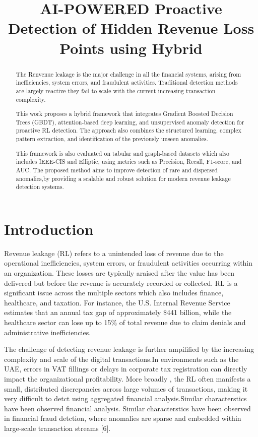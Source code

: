 \documentclass[conference]{IEEEtran}
\title{AI-POWERED Proactive Detection of Hidden Revenue Loss Points using Hybrid}
\author{
\IEEEauthorblockN{Shambhavi Jha, Venkata Shreya Vella}
\IEEEauthorblockA{Department of Computer Science \\
BITS Pilani, Dubai Campus \\
Email: f20230009@dubai.bits-pilani.ac.in, f20230096@dubai.bits-pilani.ac.in}
}
\begin{document}
\maketitle

\begin{abstract}

The Renvenue leakage is the major challenge in  all the financial systems, arising from inefficiencies, system errors, and fraudulent activities. Traditional detection methods are largely reactive they fail to scale with the current increasing transaction complexity.

This work proposes a hybrid framework that integrates Gradient Boosted Decision Trees (GBDT), attention-based deep learning, and unsupervised anomaly detection for proactive RL detection. The approach also combines the structured learning, complex pattern extraction, and identification of the previously unseen anomalies. 

This framework is also evaluated on tabular and graph-based datasets which also includes IEEE-CIS and Elliptic, using metrics such as Precision, Recall, F1-score, and AUC. The proposed method aims to improve detection of rare and dispersed anomalies,by providing a scalable and robust solution for modern revenue leakage detection systems.

\end{abstract}

\section{Introduction}

Revenue leakage (RL) refers to a unintended loss of revenue due to the operational inefficiencies, system errors, or fraudulent activities occurring within an organization. These losses are typically araised  after the value has been delivered but before the revenue is accurately recorded or collected. RL is a significant issue across the multiple sectors which also includes finance, healthcare, and taxation. For instance, the U.S. Internal Revenue Service estimates that an annual tax gap of approximately \$441 billion, while the healthcare sector can lose up to 15\% of total revenue due to claim denials and administrative inefficiencies.

The challenge of detecting revenue leakage is further ampilified by the increasing complexity and scale of the digital transactions.In environments such as the UAE, errors in VAT fillings or delays in corporate tax registration can directly impact the organizational profitability. More broadly , the RL often manifests a small, distributed discrepancies across large volumes of transactions, making it very difficult to detct using aggregated financial analysis.Similar characterstics have been observed financial analysis. Similar characterstics have been observed in financial fraud detction, where anomalies are sparse and embedded within large-scale transaction streams [6].
\end{document}
